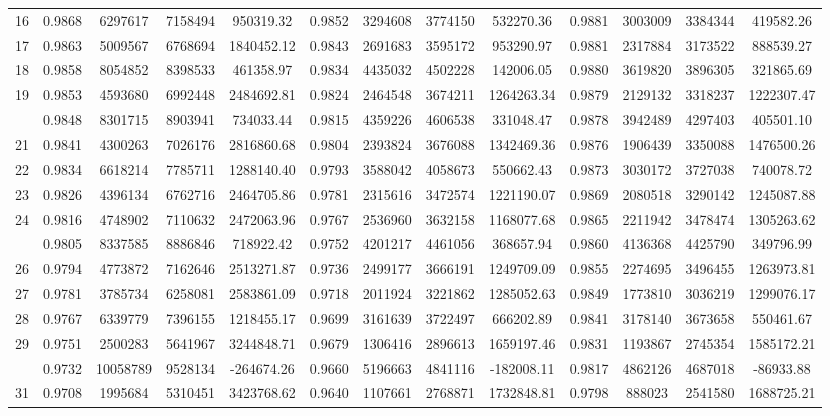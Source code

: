 \documentclass[
  12pt,
]{article}
\begin{document}
\begin{longtable}[t]{lcccccccccccc}
16 & 0.9868 & 6297617 & 7158494 & 950319.32 & 0.9852 & 3294608 & 3774150 & 532270.36 & 0.9881 & 3003009 & 3384344 & 419582.26\\
17 & 0.9863 & 5009567 & 6768694 & 1840452.12 & 0.9843 & 2691683 & 3595172 & 953290.97 & 0.9881 & 2317884 & 3173522 & 888539.27\\
18 & 0.9858 & 8054852 & 8398533 & 461358.97 & 0.9834 & 4435032 & 4502228 & 142006.05 & 0.9880 & 3619820 & 3896305 & 321865.69\\
19 & 0.9853 & 4593680 & 6992448 & 2484692.81 & 0.9824 & 2464548 & 3674211 & 1264263.34 & 0.9879 & 2129132 & 3318237 & 1222307.47\\
\addlinespace
20 & 0.9848 & 8301715 & 8903941 & 734033.44 & 0.9815 & 4359226 & 4606538 & 331048.47 & 0.9878 & 3942489 & 4297403 & 405501.10\\
21 & 0.9841 & 4300263 & 7026176 & 2816860.68 & 0.9804 & 2393824 & 3676088 & 1342469.36 & 0.9876 & 1906439 & 3350088 & 1476500.26\\
22 & 0.9834 & 6618214 & 7785711 & 1288140.40 & 0.9793 & 3588042 & 4058673 & 550662.43 & 0.9873 & 3030172 & 3727038 & 740078.72\\
23 & 0.9826 & 4396134 & 6762716 & 2464705.86 & 0.9781 & 2315616 & 3472574 & 1221190.07 & 0.9869 & 2080518 & 3290142 & 1245087.88\\
24 & 0.9816 & 4748902 & 7110632 & 2472063.96 & 0.9767 & 2536960 & 3632158 & 1168077.68 & 0.9865 & 2211942 & 3478474 & 1305263.62\\
\addlinespace
25 & 0.9805 & 8337585 & 8886846 & 718922.42 & 0.9752 & 4201217 & 4461056 & 368657.94 & 0.9860 & 4136368 & 4425790 & 349796.99\\
26 & 0.9794 & 4773872 & 7162646 & 2513271.87 & 0.9736 & 2499177 & 3666191 & 1249709.09 & 0.9855 & 2274695 & 3496455 & 1263973.81\\
27 & 0.9781 & 3785734 & 6258081 & 2583861.09 & 0.9718 & 2011924 & 3221862 & 1285052.63 & 0.9849 & 1773810 & 3036219 & 1299076.17\\
28 & 0.9767 & 6339779 & 7396155 & 1218455.17 & 0.9699 & 3161639 & 3722497 & 666202.89 & 0.9841 & 3178140 & 3673658 & 550461.67\\
29 & 0.9751 & 2500283 & 5641967 & 3244848.71 & 0.9679 & 1306416 & 2896613 & 1659197.46 & 0.9831 & 1193867 & 2745354 & 1585172.21\\
\addlinespace
30 & 0.9732 & 10058789 & 9528134 & -264674.26 & 0.9660 & 5196663 & 4841116 & -182008.11 & 0.9817 & 4862126 & 4687018 & -86933.88\\
31 & 0.9708 & 1995684 & 5310451 & 3423768.62 & 0.9640 & 1107661 & 2768871 & 1732848.81 & 0.9798 & 888023 & 2541580 & 1688725.21\\

\end{longtable}
\end{document}
